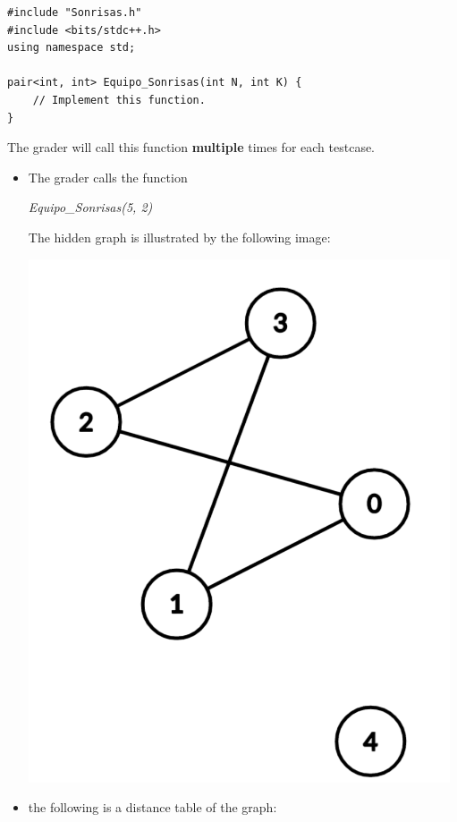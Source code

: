 \documentclass[12pt]{scrartcl}
\begin{document}
\begin{verbatim}
#include "Sonrisas.h"
#include <bits/stdc++.h>
using namespace std;

pair<int, int> Equipo_Sonrisas(int N, int K) {
    // Implement this function.
}

\end{verbatim}

    The grader will call this function \textbf{multiple} times for each testcase.
    

        \begin{itemize}
            \item The grader calls the function 
            \begin{center}
                \textit{Equipo\_Sonrisas(5, 2)}
            \end{center}
            The hidden graph is illustrated by the following image:
            \begin{center}
                \includegraphics[scale=0.3]{ej1.png}
            \end{center}
            \item the following is a distance table of the graph:
            

\end{itemize}
\end{document}
